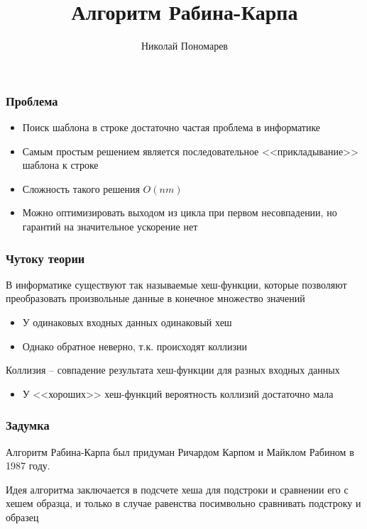 \documentclass[aspectratio=169]{beamer}
\title{Алгоритм Рабина-Карпа}
\author{Николай Пономарев}
\date{}
\begin{document}
\begin{frame}
    \maketitle
\end{frame}

\begin{frame}
    \frametitle{Проблема}
    \begin{itemize}
        \item Поиск шаблона в строке достаточно частая проблема в информатике
        \item Самым простым решением является последовательное <<прикладывание>> шаблона к строке
        \item Сложность такого решения $O(nm)$
        \item Можно оптимизировать выходом из цикла при первом несовпадении, но гарантий на значительное ускорение нет
    \end{itemize}
\end{frame}

\begin{frame}
    \frametitle{Чутоку теории}
    В информатике существуют так называемые хеш-функции, которые позволяют
    преобразовать произвольные данные в конечное множество значений
    \begin{itemize}
        \item У одинаковых входных данных одинаковый хеш
        \item Однако обратное неверно, т.к. происходят коллизии
    \end{itemize}
    Коллизия -- совпадение результата хеш-функции для разных входных данных
    \begin{itemize}
        \item У <<хороших>> хеш-функций вероятность коллизий достаточно мала
    \end{itemize}
\end{frame}

\begin{frame}
    \frametitle{Задумка}
    Алгоритм Рабина-Карпа был придуман Ричардом Карпом и Майклом Рабином в 1987 году.

    Идея алгоритма заключается в подсчете хеша для подстроки и сравнении его
    с хешем образца, и только в случае равенства посимвольно сравнивать подстроку и образец
\end{frame}
\end{document}
